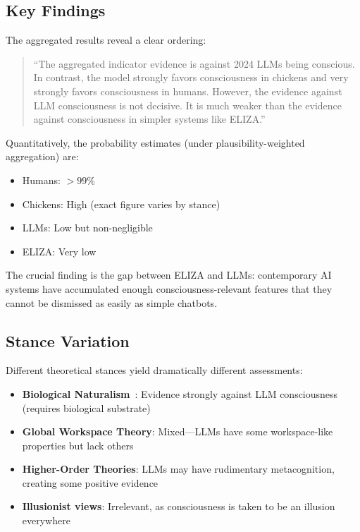 \subsection{Key Findings}

The aggregated results reveal a clear ordering:

\begin{quote}
``The aggregated indicator evidence is against 2024 LLMs being conscious. In contrast, the model strongly favors consciousness in chickens and very strongly favors consciousness in humans. However, the evidence against LLM consciousness is not decisive. It is much weaker than the evidence against consciousness in simpler systems like ELIZA.''~\citep[p.~6]{shiller2026dcm}
\end{quote}

Quantitatively, the probability estimates (under plausibility-weighted aggregation) are:
\begin{itemize}
    \item Humans: $>99\%$
    \item Chickens: High (exact figure varies by stance)
    \item LLMs: Low but non-negligible
    \item ELIZA: Very low
\end{itemize}

The crucial finding is the gap between ELIZA and LLMs: contemporary AI systems have accumulated enough consciousness-relevant features that they cannot be dismissed as easily as simple chatbots.

\subsection{Stance Variation}

Different theoretical stances yield dramatically different assessments:

\begin{itemize}
    \item \textbf{Biological Naturalism}~\citep{seth2024biological}: Evidence strongly against LLM consciousness (requires biological substrate)

    \item \textbf{Global Workspace Theory}: Mixed---LLMs have some workspace-like properties but lack others

    \item \textbf{Higher-Order Theories}: LLMs may have rudimentary metacognition, creating some positive evidence

    \item \textbf{Illusionist views}: Irrelevant, as consciousness is taken to be an illusion everywhere
\end{itemize}

